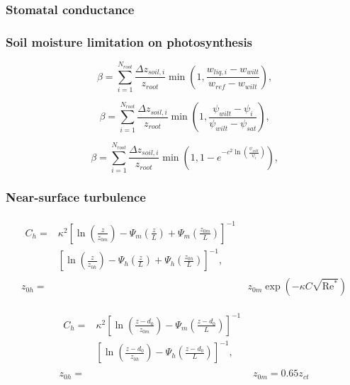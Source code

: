\documentclass[essd]{copernicus}
\begin{document}
\subsubsection{Stomatal conductance}

\subsubsection{Soil moisture limitation on photosynthesis}

\begin{equation}
    \beta = \sum_{i=1}^{N_{root}} \frac{\Delta z_{soil,i}}{z_{root}}
    \min\left(1, \frac{w_{liq,i} - w_{wilt}}{w_{ref} - w_{wilt}}\right)
    \text{,}
\end{equation}

\begin{equation}
    \beta = \sum_{i=1}^{N_{root}} \frac{\Delta z_{soil,i}}{z_{root}}
    \min\left(1, \frac{\psi_{wilt} - \psi_{i}}{\psi_{wilt} - \psi_{sat}}\right)
    \text{,}
\end{equation}

\begin{equation}
    \beta = \sum_{i=1}^{N_{root}} \frac{\Delta z_{soil,i}}{z_{root}}
    \min\left(1, 1 - e^{-c^2 \ln\left(\frac{\psi_{wilt}}{\psi_{i}} \right)} \right)
    \text{,}
\end{equation}

\subsubsection{Near-surface turbulence}

\begin{align}
    \begin{split}
        C_h = & \kappa^2 \left[ \ln\left(\frac{z}{z_{0m}}\right)
        - \Psi_{m}\left(\frac{z}{L}\right)
         + \Psi_{m}\left(\frac{z_{0m}}{L}\right) \right]^{-1} \\
        & \left[ \ln\left(\frac{z}{z_{0h}}\right)
        - \Psi_{h}\left(\frac{z}{L}\right)
        + \Psi_{h}\left(\frac{z_{0h}}{L}\right) \right]^{-1} \text{,}
    \end{split}                                      \\
    z_{0h} = & z_{0m} \exp\left(-\kappa C \sqrt{\text{Re}^*}\right)
\end{align}

\begin{align}
    \begin{split}
        C_h = & \kappa^2 \left[ \ln\left(\frac{z-d_0}{z_{0m}}\right)
        - \Psi_{m}\left(\frac{z-d_0}{L}\right) \right]^{-1} \\
        & \left[ \ln\left(\frac{z-d_0}{z_{0h}}\right)
        - \Psi_{h}\left(\frac{z-d_0}{L}\right) \right]^{-1}
        \text{,}
    \end{split}      \\
    z_{0h} = & z_{0m} = 0.65 z_{ct}
\end{align}
\end{document}

